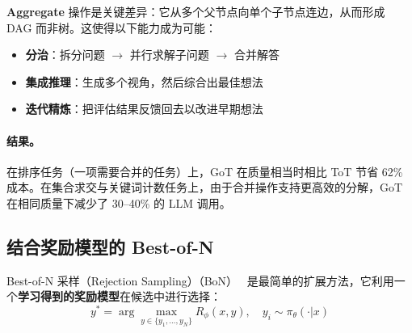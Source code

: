 \textbf{Aggregate} 操作是关键差异：它从多个父节点向单个子节点连边，从而形成 DAG 而非树。这使得以下能力成为可能：

\begin{itemize}
  \item \textbf{分治}：拆分问题 $\to$ 并行求解子问题 $\to$ 合并解答
  \item \textbf{集成推理}：生成多个视角，然后综合出最佳想法
  \item \textbf{迭代精炼}：把评估结果反馈回去以改进早期想法
\end{itemize}

\paragraph{结果。}
\label{results.-1}

在排序任务（一项需要合并的任务）上，GoT 在质量相当时相比 ToT 节省 62\% 成本。在集合求交与关键词计数任务上，由于合并操作支持更高效的分解，GoT 在相同质量下减少了 30--40\% 的 LLM 调用。

\subsection{结合奖励模型的 Best-of-N}
\label{subsec:bon_method}

Best-of-N 采样（Rejection Sampling）（BoN）~\cite{nakano2021webgpt, stiennon2020learning} 是最简单的扩展方法，它利用一个\textbf{学习得到的奖励模型}在候选中进行选择：
\begin{equation}
y^* = \arg\max_{y \in \{y_1, \ldots, y_N\}} R_\phi(x, y), \quad y_i \sim \pi_\theta(\cdot | x)
\end{equation}

